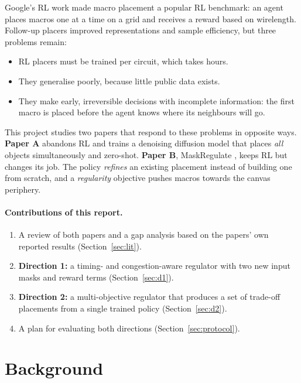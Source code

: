 \documentclass{article}
\begin{document}
Google's RL work \citep{mirhoseini2021graph} made macro placement a popular RL benchmark: an agent places
macros one at a time on a grid and receives a reward based on wirelength. Follow-up placers
\citep{lai2022maskplace, lai2023chipformer, geng2024efficientplace} improved representations and sample
efficiency, but three problems remain:
\begin{itemize}
  \item RL placers must be trained per circuit, which takes hours.
  \item They generalise poorly, because little public data exists.
  \item They make early, irreversible decisions with incomplete information: the first macro is placed
  before the agent knows where its neighbours will go.
\end{itemize}

This project studies two papers that respond to these problems in opposite ways. \textbf{Paper A}
\citep{lee2025diffusion} abandons RL and trains a denoising diffusion model that places \emph{all}
objects simultaneously and zero-shot. \textbf{Paper B}, MaskRegulate \citep{xue2024maskregulate}, keeps
RL but changes its job. The policy \emph{refines} an existing placement instead of building one from
scratch, and a \emph{regularity} objective pushes macros towards the canvas periphery.

\paragraph{Contributions of this report.}
\begin{enumerate}
  \item A review of both papers and a gap analysis based on the papers' own reported results
  (Section~\ref{sec:lit}).
  \item \textbf{Direction 1:} a timing- and congestion-aware regulator with two new input masks and
  reward terms (Section~\ref{sec:d1}).
  \item \textbf{Direction 2:} a multi-objective regulator that produces a set of trade-off placements
  from a single trained policy (Section~\ref{sec:d2}).
  \item A plan for evaluating both directions (Section~\ref{sec:protocol}).
\end{enumerate}

\section{Background}
\label{sec:bg}
\end{document}
